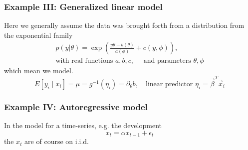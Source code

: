 
\subsubsection{Example III: Generalized linear model}
Here we generally assume the data was brought forth from a distribution from the exponential family
\begin{equation}
    \begin{multlined}
        p(y | \theta) = \exp{\left( \frac{y\theta - b(\theta)}{a(\phi)} + c(y,\phi) \right)},  \\
        \text{with real functions } a,b,c, \quad \text{ and parameters } \theta, \phi
    \end{multlined}
\end{equation}
which mean we model.
\begin{equation}
    E[y_i\mid x_i] = \mu = g^{-1}(\eta_i) = \partial_\theta b, \quad \text{linear predictor } \eta_i = \vec{\beta}^T \vec{x}_i 
\end{equation}

\subsubsection{Example IV: Autoregressive model}
In the model for a time-series, e.g. the development
\begin{equation}
    x_t = \alpha x_{t-1} + \epsilon_t
\end{equation}
the $x_t$ are of course on i.i.d.

